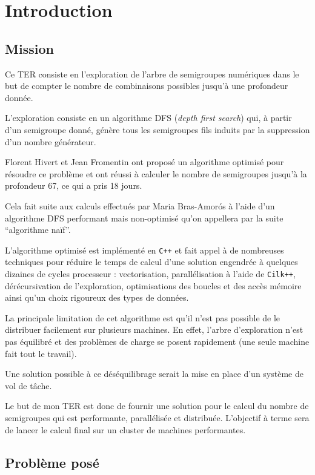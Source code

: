 \documentclass[12pt,a4paper]{article}
\begin{document}
\section*{Introduction}

\subsection*{Mission}

Ce TER consiste en l'exploration de l'arbre de semigroupes numériques dans le but de compter le nombre de combinaisons possibles jusqu'à une profondeur donnée.

L'exploration consiste en un algorithme DFS (\emph{depth first search}) qui, à partir d'un semigroupe donné, génère tous les semigroupes fils induits par la suppression d'un nombre générateur.

Florent Hivert et Jean Fromentin ont proposé un algorithme optimisé pour résoudre ce problème et ont réussi à calculer le nombre de semigroupes jusqu'à la profondeur 67, ce qui a pris 18 jours.

Cela fait suite aux calculs effectués par Maria Bras-Amorós à l'aide d'un algorithme DFS performant mais non-optimisé qu'on appellera par la suite ``algorithme naïf''.

L'algorithme optimisé est implémenté en \texttt{C++} et fait appel à de nombreuses techniques pour réduire le temps de calcul d'une solution engendrée à quelques dizaines de cycles processeur : vectorisation, parallélisation à l'aide de \texttt{Cilk++}, dérécursivation de l'exploration, optimisations des boucles et des accès mémoire ainsi qu'un choix rigoureux des types de données.

La principale limitation de cet algorithme est qu'il n'est pas possible de le distribuer facilement sur plusieurs machines. En effet, l'arbre d'exploration n'est pas équilibré et des problèmes de charge se posent rapidement (une seule machine fait tout le travail).

Une solution possible à ce déséquilibrage serait la mise en place d'un système de vol de tâche.

Le but de mon TER est donc de fournir une solution pour le calcul du nombre de semigroupes qui est performante, parallélisée et distribuée. L'objectif à terme sera de lancer le calcul final sur un cluster de machines performantes.

\subsection*{Problème posé}
\end{document}
